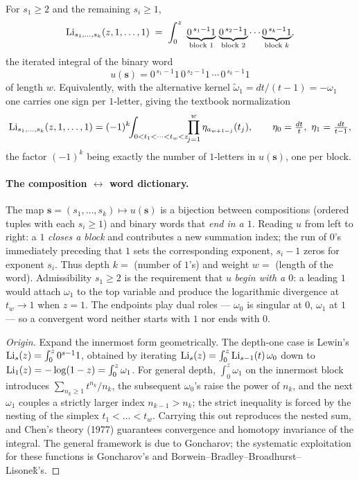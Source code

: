 \begin{theorem}\label{found:thm:iter}
For $s_1\ge2$ and the remaining $s_i\ge1$,
\[
  \operatorname{Li}_{s_1,\dots,s_k}(z,1,\dots,1)
  \;=\;\int_0^z\ \underbrace{0^{\,s_1-1}1}_{\text{block }1}\,\underbrace{0^{\,s_2-1}1}_{\text{block }2}\cdots\underbrace{0^{\,s_k-1}1}_{\text{block }k},
\]
the iterated integral of the binary word
\[
  u(\mathbf s)=0^{\,s_1-1}1\,0^{\,s_2-1}1\,\cdots\,0^{\,s_k-1}1
\]
of length $w$. Equivalently, with the alternative kernel $\widetilde\omega_1=dt/(t-1)=-\omega_1$ one carries one sign per $1$-letter, giving the textbook normalization
\[
  \operatorname{Li}_{s_1,\dots,s_k}(z,1,\dots,1)=(-1)^k\!\!\int_{0<t_1<\dots<t_w<z}\!\!\prod_{j=1}^{w}\eta_{a_{w+1-j}}(t_j),\qquad
  \eta_0=\tfrac{dt}{t},\ \eta_1=\tfrac{dt}{t-1},
\]
the factor $(-1)^k$ being exactly the number of $1$-letters in $u(\mathbf s)$, one per block.
\end{theorem}

\paragraph{The composition $\leftrightarrow$ word dictionary.} The map $\mathbf s=(s_1,\dots,s_k)\mapsto u(\mathbf s)$ is a bijection between compositions (ordered tuples with each $s_i\ge1$) and binary words that \emph{end in a $1$}. Reading $u$ from left to right: a $1$ \emph{closes a block} and contributes a new summation index; the run of $0$'s immediately preceding that $1$ sets the corresponding exponent, $s_i-1$ zeros for exponent $s_i$. Thus depth $k=$ (number of $1$'s) and weight $w=$ (length of the word). Admissibility $s_1\ge2$ is the requirement that $u$ \emph{begin with a $0$}: a leading $1$ would attach $\omega_1$ to the top variable and produce the logarithmic divergence at $t_w\to1$ when $z=1$. The endpoints play dual roles --- $\omega_0$ is singular at $0$, $\omega_1$ at $1$ --- so a convergent word neither starts with $1$ nor ends with $0$.

\begin{proof}[Origin]
Expand the innermost form geometrically. The depth-one case is Lewin's
$\operatorname{Li}_s(z)=\int_0^z 0^{s-1}1$, obtained by iterating $\operatorname{Li}_s(z)=\int_0^z\operatorname{Li}_{s-1}(t)\,\omega_0$ down to $\operatorname{Li}_1(z)=-\log(1-z)=\int_0^z\omega_1$. For general depth, $\int_0^z\omega_1$ on the innermost block introduces $\sum_{n_k\ge1}t^{n_k}/n_k$, the subsequent $\omega_0$'s raise the power of $n_k$, and the next $\omega_1$ couples a strictly larger index $n_{k-1}>n_k$; the strict inequality is forced by the nesting of the simplex $t_1<\dots<t_w$. Carrying this out reproduces the nested sum, and Chen's theory (1977) guarantees convergence and homotopy invariance of the integral. The general framework is due to Goncharov; the systematic exploitation for these functions is Goncharov's and Borwein--Bradley--Broadhurst--Lisone\v{k}'s.
\end{proof}

